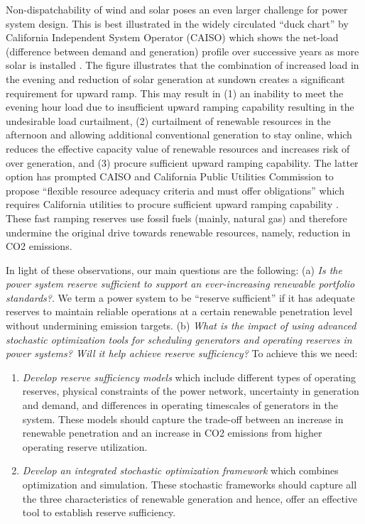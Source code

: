 Non-dispatchability of wind and solar poses an even larger challenge for power system design. This is best illustrated in the widely circulated ``duck chart'' by California Independent System Operator (CAISO) which shows the net-load (difference between demand and generation) profile over successive years as more solar is installed \cite{Duck16}. The figure illustrates that the combination of increased load in the evening and reduction of solar generation at sundown creates a significant requirement for upward ramp. This may result in (1) an inability to meet the evening hour load due to insufficient upward ramping capability resulting in the undesirable load curtailment, (2) curtailment of renewable resources in the afternoon and allowing additional conventional generation to stay online, which reduces the effective capacity value of renewable resources and increases risk of over generation, and (3) procure sufficient upward ramping capability. The latter option has prompted CAISO and California Public Utilities Commission to propose ``flexible resource adequacy criteria and must offer obligations'' which requires California utilities to procure sufficient upward ramping capability \cite{FracMoo16}. These fast ramping reserves use fossil fuels (mainly, natural gas) and therefore undermine the original drive towards renewable resources, namely, reduction in CO2 emissions.

\gap

In light of these observations, our main questions are the following: (a) \textit{Is the power system reserve sufficient to support an ever-increasing renewable portfolio standards?}. We term a power system to be ``reserve sufficient'' if it has adequate reserves to maintain reliable operations at a certain renewable penetration level without undermining emission targets. (b) \textit{What is the impact of using advanced stochastic optimization tools for scheduling generators and operating reserves in power systems? Will it help achieve reserve sufficiency?} To achieve this we need:
\begin{enumerate} \itemsep0em
	\item {\it Develop reserve sufficiency models} which include different types of operating reserves, physical constraints of the power network, uncertainty in generation and demand, and differences in operating timescales of generators in the system. These models should capture the trade-off between an increase in renewable penetration and an increase in CO2 emissions from higher operating reserve utilization.
	\item {\it Develop an integrated stochastic optimization framework} which combines optimization and simulation. These stochastic frameworks should capture all the three characteristics of renewable generation and hence, offer an effective tool to establish reserve sufficiency.
\end{enumerate}

